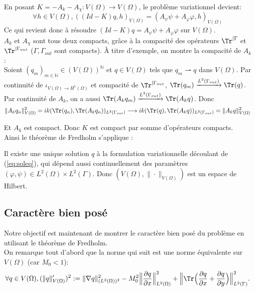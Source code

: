 En posant $K = -A_k - A_\chi:V(\Omega)\to V(\Omega)$, le problème variationnel devient:
\[\forall h\in V(\Omega), ((Id-K)q,h)_{V(\Omega)} = (A_{\psi}\psi+A_{\varphi}\varphi, h)_{V(\Omega)}\]
Ce qui revient donc à résoudre $(Id-K)q = A_{\psi}\psi+A_{\varphi}\varphi$ sur $V(\Omega)$. \\
$A_k$ et $A_\chi$ sont tous deux compacts, grâce à la compacité des opérateurs $\Tr^{|\Gamma}$ et $\Tr^{|\Gamma_{out}}$ ($\Gamma,\Gamma_{out}$ sont compacts). À titre d'exemple, on montre la compacité de $A_k$ : \\

Soient $\displaystyle (q_m)_{m\in \mathbb{N}}\in (V(\Omega))^\mathbb{N}$ et $q\in V(\Omega)$ tels que $q_m\rightharpoonup q$ dans $V(\Omega)$. Par continuité de $\displaystyle \iota_{V(\Omega)\to H^1(\Omega)}$ et compacité de $\displaystyle \Tr^{|\Gamma_{out}}$, $\displaystyle \Tr(q_m)\xrightarrow{L^2(\Gamma_{out})}\Tr(q)$. Par continuité de $A_k$, on a aussi $\displaystyle \Tr(A_kq_m)\xrightarrow{L^2(\Gamma_{out})}\Tr(A_kq)$. Donc
\[\|A_kq_n\|^2_{V(\Omega)} = ik(\Tr(q_n),\Tr(A_kq_n))_{L^2(\Gamma_{out})}\longrightarrow ik(\Tr(q),\Tr(A_kq))_{L^2(\Gamma_{out})} = \|A_kq\|^2_{V(\Omega)}\]

Et $A_k$ est compact. Donc $K$ est compact par somme d'opérateurs compacts. \\
Ainsi le théorème de Fredholm s'applique :
\begin{tcolorbox}[colback=red!5!white,colframe=red!75!black,title=Proposition 4.3.1 : Espace de solutions de Hilbert]
Il existe une unique solution $q$ à la formulation variationnelle découlant de (\ref{eq:soleq}), qui dépend aussi continuellement des paramètres $(\varphi,\psi)\in L^2(\Omega)\times L^2(\Gamma)$.
Donc $\displaystyle (V(\Omega),\|\cdot\|_{V(\Omega)})$ est un espace de Hilbert.
\end{tcolorbox}
\subsection{Caractère bien posé}

Notre objectif est maintenant de montrer le caractère bien posé du problème en utilisant le théorème de Fredholm. \\

On remarque tout d'abord que la norme qui suit est une norme équivalente sur $V(\Omega)$ (car $M_0 < 1$): \[\forall q\in V(\Omega), (\|q\|'_{V(\Omega)})^2:= \|\nabla q\|_{(L^2(\Omega))^2}^2 - M_0^2\Big\|\frac{\partial q}{\partial x}\Big\|_{L^2(\Omega)}^2+\Big\|\Tr\Big(\frac{\partial q}{\partial x}+\frac{\partial q}{\partial y}\Big)\Big\|_{L^2(\Gamma)}^2.\]

